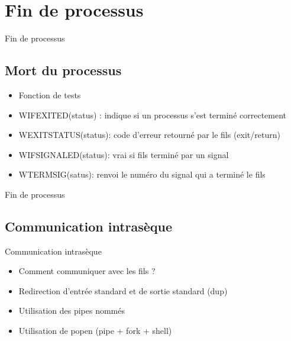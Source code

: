 \def\sectitle{Fin de processus}
\section{\sectitle}
\begin{frame}{\sectitle}
\begin{block}{\subsectitle}
\def\subsectitle{Mort du processus}
\subsection{\subsectitle}
\begin{itemize}
    \item Fonction de tests
    \item WIFEXITED(status) : indique si un processus s'est terminé correctement
    \item WEXITSTATUS(status): code d'erreur retourné par le fils (exit/return)
    \item WIFSIGNALED(status): vrai si fils terminé par un signal
    \item WTERMSIG(satus): renvoi le numéro du signal qui a terminé le fils
\end{itemize}
\end{block}
\end{frame}


\begin{frame}{\sectitle}
\def\subsectitle{Communication intrasèque}
\subsection{\subsectitle}
\begin{block}{\subsectitle}
\begin{itemize}
    \item Comment communiquer avec les fils ?
    \item Redirection d'entrée standard et de sortie standard (dup)
    \item Utilisation des pipes nommés
    \item Utilisation de popen (pipe + fork + shell)
\end{itemize}
\end{block}
\end{frame}

\def\sectitle{Divers}
